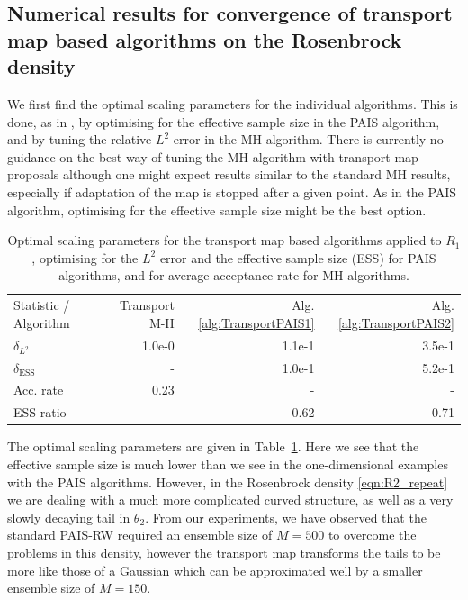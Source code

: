 \documentclass[final]{siamltex}
\begin{document}
\subsection[Numerical results]{Numerical results for convergence of
  transport map based algorithms on the Rosenbrock density}

We first find the optimal scaling parameters for the individual
algorithms. This is done, as in \cite{cotter2015parallel}, by optimising for the effective sample size in
the PAIS algorithm, and by tuning the relative $L^2$ error in the MH
algorithm. There is currently no
guidance on the best way of tuning the MH algorithm with transport map
proposals although one might expect results similar to the standard MH
results, especially if adaptation of the map is stopped after a given
point. As in the PAIS algorithm, optimising for the effective sample size might be the best option.

\begin{table}[!ht]
\centering
\begin{tabular}{lrrr}
\toprule
	Statistic \quad / \quad Algorithm & Transport M-H &
                                                            Alg. \ref{alg:TransportPAIS1} & Alg. \ref{alg:TransportPAIS2}  \\ \cmidrule(lr){1-4}
	$\delta_{L^2}$				 & 1.0e-0 & 1.1e-1 & 3.5e-1 \\
	$\delta_{\text{ESS}}$				 & - & 1.0e-1 & 5.2e-1 \\ \cmidrule(lr){1-4}
	Acc. rate							 & 0.23 & - & - \\
	ESS ratio							 & - & 0.62 & 0.71 \\
\bottomrule
\end{tabular}
\caption{Optimal scaling parameters for the transport map based
  algorithms applied to $R_1$, optimising for the $L^2$ error and
  the effective sample size (ESS) for PAIS algorithms, and for average
  acceptance rate for MH algorithms.}
\label{tab:R2_opt_scaling}
\end{table}

The optimal scaling parameters are given in
Table~\ref{tab:R2_opt_scaling}. Here we see that the effective sample
size is much lower than we see in the one-dimensional examples with
the PAIS algorithms. However, in the Rosenbrock density
\eqref{eqn:R2_repeat} we are dealing with a much more complicated
curved structure, as well as a very slowly decaying tail in
$\theta_2$. From our experiments, we have observed that the standard PAIS-RW required an ensemble size of $M=500$ to overcome the problems in this density, however the transport map transforms the tails to be more like those of a Gaussian which can be approximated well by a smaller ensemble size of $M=150$.
\end{document}
